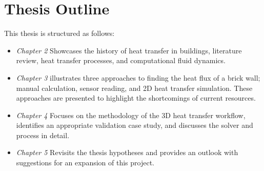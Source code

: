 \section{Thesis Outline}
This thesis is structured as follows:
\begin{itemize}
    \item \textit{Chapter 2} Showcases the history of heat transfer in buildings, literature review, heat transfer processes, and computational fluid dynamics.
     \item \textit{Chapter 3} illustrates three approaches to finding the heat flux of a brick wall; manual calculation, sensor reading, and 2D heat transfer simulation. These approaches are presented to highlight the shortcomings of current resources. 
      \item \textit{Chapter 4} Focuses on the methodology of the 3D heat transfer workflow, identifies an appropriate validation case study, and discusses the solver and process in detail.
       \item \textit{Chapter 5} Revisits the thesis hypotheses and provides an outlook with suggestions for an expansion of this project.
\end{itemize}